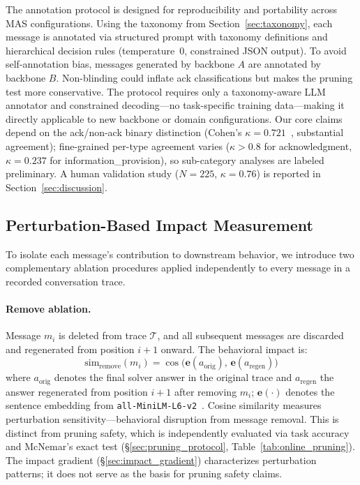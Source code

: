 The annotation protocol is designed for reproducibility and portability across MAS configurations. Using the taxonomy from Section~\ref{sec:taxonomy}, each message is annotated via structured prompt with taxonomy definitions and hierarchical decision rules (temperature~0, constrained JSON output). To avoid self-annotation bias, messages generated by backbone $A$ are annotated by backbone $B$. Non-blinding could inflate ack classifications but makes the pruning test more conservative. The protocol requires only a taxonomy-aware LLM annotator and constrained decoding---no task-specific training data---making it directly applicable to new backbone or domain configurations. Our core claims depend on the ack/non-ack binary distinction (Cohen's $\kappa{=}0.721$~\cite{cohen_1960}, substantial agreement); fine-grained per-type agreement varies ($\kappa > 0.8$ for acknowledgment, $\kappa{=}0.237$ for information\_provision), so sub-category analyses are labeled preliminary. A human validation study ($N = 225$, $\kappa = 0.76$) is reported in Section~\ref{sec:discussion}.

\subsection{Perturbation-Based Impact Measurement}
\label{sec:perturbation}

To isolate each message's contribution to downstream behavior, we introduce two complementary ablation procedures applied independently to every message in a recorded conversation trace.

\paragraph{Remove ablation.} Message $m_i$ is deleted from trace $\mathcal{T}$, and all subsequent messages are discarded and regenerated from position $i+1$ onward. The behavioral impact is:
\begin{equation}
    \text{sim}_{\text{remove}}(m_i) = \cos\bigl(\mathbf{e}(a_{\text{orig}}),\, \mathbf{e}(a_{\text{regen}})\bigr)
\label{eq:impact}
\end{equation}
where $a_{\text{orig}}$ denotes the final solver answer in the original trace and $a_{\text{regen}}$ the answer regenerated from position $i{+}1$ after removing $m_i$; $\mathbf{e}(\cdot)$ denotes the sentence embedding from \texttt{all-MiniLM-L6-v2}~\cite{reimers_sentence_bert_2019}. Cosine similarity measures perturbation sensitivity---behavioral disruption from message removal. This is distinct from pruning safety, which is independently evaluated via task accuracy and McNemar's exact test (\S\ref{sec:pruning_protocol}, Table~\ref{tab:online_pruning}). The impact gradient (\S\ref{sec:impact_gradient}) characterizes perturbation patterns; it does not serve as the basis for pruning safety claims.

